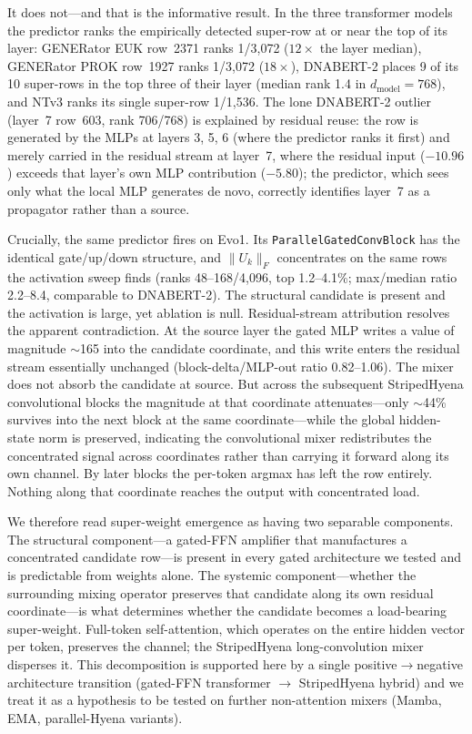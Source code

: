 \documentclass[11pt]{article}
\begin{document}
It does not---and that is the informative result. In the three
transformer models the predictor ranks the empirically detected
super-row at or near the top of its layer: GENERator EUK row~2371 ranks
1/3{,}072 ($12\times$ the layer median), GENERator PROK row~1927 ranks
1/3{,}072 ($18\times$), DNABERT-2 places 9 of its 10 super-rows in the
top three of their layer (median rank 1.4 in $d_{\text{model}}=768$),
and NTv3 ranks its single super-row 1/1{,}536. The lone DNABERT-2
outlier (layer~7 row~603, rank 706/768) is explained by residual reuse:
the row is generated by the MLPs at layers 3, 5, 6 (where the predictor
ranks it first) and merely carried in the residual stream at layer~7,
where the residual input ($-10.96$) exceeds that layer's own MLP
contribution ($-5.80$); the predictor, which sees only what the local
MLP generates de novo, correctly identifies layer~7 as a propagator
rather than a source.

Crucially, the same predictor fires on Evo1. Its
\texttt{ParallelGatedConvBlock} has the identical gate/up/down structure,
and $\|U_k\|_F$ concentrates on the same rows the activation sweep finds
(ranks 48--168/4{,}096, top 1.2--4.1\%; max/median ratio 2.2--8.4,
comparable to DNABERT-2). The structural candidate is present and the
activation is large, yet ablation is null. Residual-stream attribution
resolves the apparent contradiction. At the source layer the gated MLP
writes a value of magnitude $\sim$165 into the candidate coordinate, and
this write enters the residual stream essentially unchanged
(block-delta/MLP-out ratio 0.82--1.06). The mixer does not absorb the
candidate at source. But across the subsequent StripedHyena
convolutional blocks the magnitude at that coordinate attenuates---only
$\sim$44\% survives into the next block at the same coordinate---while
the global hidden-state norm is preserved, indicating the convolutional
mixer redistributes the concentrated signal across coordinates rather
than carrying it forward along its own channel. By later blocks the
per-token argmax has left the row entirely. Nothing along that
coordinate reaches the output with concentrated load.

We therefore read super-weight emergence as having two separable
components. The structural component---a gated-FFN amplifier that
manufactures a concentrated candidate row---is present in every gated
architecture we tested and is predictable from weights alone. The
systemic component---whether the surrounding mixing operator preserves
that candidate along its own residual coordinate---is what determines
whether the candidate becomes a load-bearing super-weight. Full-token
self-attention, which operates on the entire hidden vector per token,
preserves the channel; the StripedHyena long-convolution mixer disperses
it. This decomposition is supported here by a single
positive$\rightarrow$negative architecture transition (gated-FFN
transformer $\rightarrow$ StripedHyena hybrid) and we treat it as a
hypothesis to be tested on further non-attention mixers (Mamba, EMA,
parallel-Hyena variants).
\end{document}
